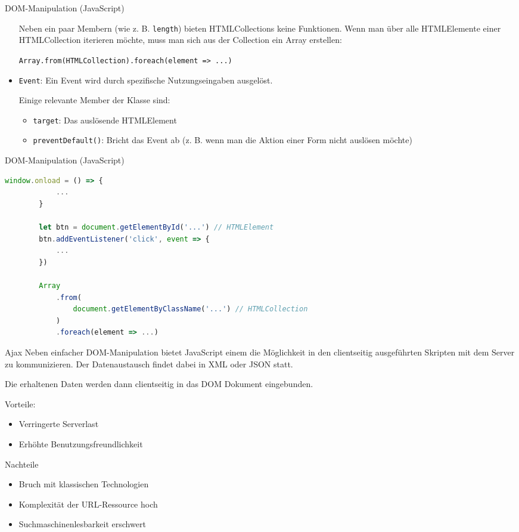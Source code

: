 \begin{defi}{DOM-Manipulation (JavaScript)}
\begin{itemize}
              Neben ein paar Membern (wie z. B. \texttt{length}) bieten HTMLCollections keine Funktionen.
              Wenn man über alle HTMLElemente einer HTMLCollection iterieren möchte, muss man sich aus der Collection ein Array erstellen:

              \texttt{Array.from(HTMLCollection).foreach(element => {...})}
        \item \texttt{Event}: Ein Event wird durch spezifische Nutzungseingaben ausgelöst.

              Einige relevante Member der Klasse sind:
              \begin{itemize}
                  \item \texttt{target}: Das auslösende HTMLElement
                  \item \texttt{preventDefault()}: Bricht das Event ab (z. B. wenn man die Aktion einer Form nicht auslösen möchte)
              \end{itemize}
    \end{itemize}
\end{defi}

\begin{example}{DOM-Manipulation (JavaScript)}
    \begin{lstlisting}[language=JavaScript]
        window.onload = () => {
            ...
        }

        let btn = document.getElementById('...') // HTMLElement
        btn.addEventListener('click', event => {
            ...
        })

        Array
            .from(
                document.getElementByClassName('...') // HTMLCollection
            )
            .foreach(element => ...)
    \end{lstlisting}
\end{example}

\begin{bonus}{Ajax}
    Neben einfacher DOM-Manipulation bietet JavaScript einem die Möglichkeit in den clientseitig ausgeführten Skripten mit dem Server zu kommunizieren.
    Der Datenaustausch findet dabei in XML oder JSON statt.

    Die erhaltenen Daten werden dann clientseitig in das DOM Dokument eingebunden.

    Vorteile:
    \begin{itemize}
        \item Verringerte Serverlast
        \item Erhöhte Benutzungsfreundlichkeit
    \end{itemize}

    Nachteile
    \begin{itemize}
        \item Bruch mit klassischen Technologien
        \item Komplexität der URL-Ressource hoch
        \item Suchmaschinenlesbarkeit erschwert
    \end{itemize}
\end{bonus}

